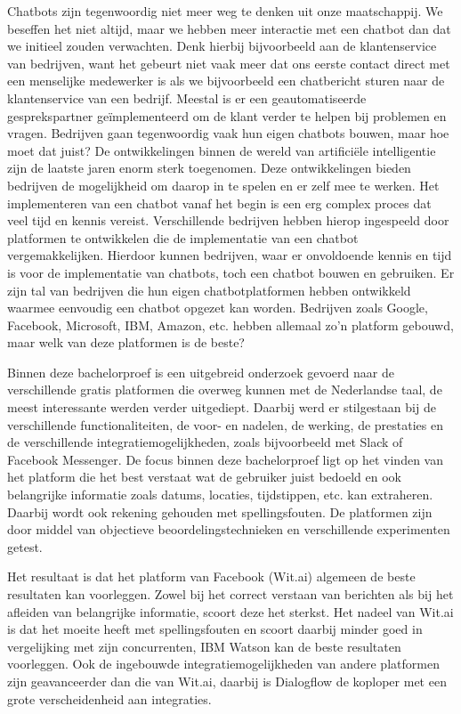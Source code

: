 Chatbots zijn tegenwoordig niet meer weg te denken uit onze maatschappij. We beseffen het niet altijd, maar we hebben meer interactie met een chatbot dan dat we initieel zouden verwachten. Denk hierbij bijvoorbeeld aan de klantenservice van bedrijven, want het gebeurt niet vaak meer dat ons eerste contact direct met een menselijke medewerker is als we bijvoorbeeld een chatbericht sturen naar de klantenservice van een bedrijf. Meestal is er een geautomatiseerde gesprekspartner geïmplementeerd om de klant verder te helpen bij problemen en vragen. Bedrijven gaan tegenwoordig vaak hun eigen chatbots bouwen, maar hoe moet dat juist? De ontwikkelingen binnen de wereld van artificiële intelligentie zijn de laatste jaren enorm sterk toegenomen. Deze ontwikkelingen bieden bedrijven de mogelijkheid om daarop in te spelen en er zelf mee te werken. Het implementeren van een chatbot vanaf het begin is een erg complex proces dat veel tijd en kennis vereist. Verschillende bedrijven hebben hierop ingespeeld door platformen te ontwikkelen die de implementatie van een chatbot vergemakkelijken. Hierdoor kunnen bedrijven, waar er onvoldoende kennis en tijd is voor de implementatie van chatbots, toch een chatbot bouwen en gebruiken. Er zijn tal van bedrijven die hun eigen chatbotplatformen hebben ontwikkeld waarmee eenvoudig een chatbot opgezet kan worden. Bedrijven zoals Google, Facebook, Microsoft, IBM, Amazon, etc. hebben allemaal zo’n platform gebouwd, maar welk van deze platformen is de beste?

Binnen deze bachelorproef is een uitgebreid onderzoek gevoerd naar de verschillende gratis platformen die overweg kunnen met de Nederlandse taal, de meest interessante werden verder uitgediept. Daarbij werd er stilgestaan bij de verschillende functionaliteiten, de voor- en nadelen, de werking, de prestaties en de verschillende integratiemogelijkheden, zoals bijvoorbeeld met Slack of Facebook Messenger. De focus binnen deze bachelorproef ligt op het vinden van het platform die het best verstaat wat de gebruiker juist bedoeld en ook belangrijke informatie zoals datums, locaties, tijdstippen, etc. kan extraheren. Daarbij wordt ook rekening gehouden met spellingsfouten. De platformen zijn door middel van objectieve beoordelingstechnieken en verschillende experimenten getest. 

Het resultaat is dat het platform van Facebook (Wit.ai) algemeen de beste resultaten kan voorleggen. Zowel bij het correct verstaan van berichten als bij het afleiden van belangrijke informatie, scoort deze het sterkst. Het nadeel van Wit.ai is dat het moeite heeft met spellingsfouten en scoort daarbij minder goed in vergelijking met zijn concurrenten, IBM Watson kan de beste resultaten voorleggen. Ook de ingebouwde integratiemogelijkheden van andere platformen zijn geavanceerder dan die van Wit.ai, daarbij is Dialogflow de koploper met een grote verscheidenheid aan integraties.

